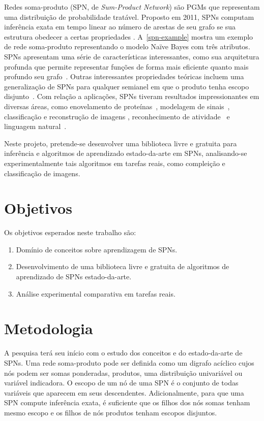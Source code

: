 \documentclass[12pt]{article}
\theoremstyle{plain}
\numberwithin{equation}{section}
\begin{document}
Redes soma-produto (SPN, de \textit{Sum-Product Network}) são PGMs que representam uma distribuição
de probabilidade tratável. Proposto em 2011, SPNs computam inferência exata em tempo linear ao
número de arestas de seu grafo se sua estrutura obedecer a certas propriedades
\cite{poon-domingos}. A~\autoref{spn-example} mostra um exemplo de rede soma-produto representando
o modelo Naïve Bayes com três atributos. SPNs apresentam uma série de características
interessantes, como sua arquitetura profunda que permite representar funções de forma mais
eficiente quanto mais profundo seu grafo~\cite{shallow-vs-deep}. Outras interessantes propriedades
teóricas incluem uma generalização de SPNs para qualquer semianel em que o produto tenha escopo
disjunto~\cite{sp-theorem}. Com relação a aplicações, SPNs tiveram resultados impressionantes em
diversas áreas, como enovelamento de proteínas~\cite{rec-dec-non-convex}, modelagem de
sinais~\cite{model-speech}, classificação e reconstrução de imagens
\cite{gens-domingos,poon-domingos,clustering}, reconhecimento de atividade~\cite{activity} e
linguagem natural~\cite{nat-lang}.

Neste projeto, pretende-se desenvolver uma biblioteca livre e gratuita para inferência e algoritmos
de aprendizado estado-da-arte em SPNs, analisando-se experimentalmente tais algoritmos em tarefas
reais, como compleição e classificação de imagens.

\section{Objetivos}

Os objetivos esperados neste trabalho são:

\begin{enumerate}
  \item Domínio de conceitos sobre aprendizagem de SPNs.
  \item Desenvolvimento de uma biblioteca livre e gratuita de algoritmos de aprendizado de SPNs
    estado-da-arte.
  \item Análise experimental comparativa em tarefas reais.
\end{enumerate}

\section{Metodologia}

A pesquisa terá seu início com o estudo dos conceitos e do estado-da-arte de SPNs. Uma rede
soma-produto pode ser definida como um digrafo acíclico cujos nós podem ser somas ponderadas,
produtos, uma distribuição univariável ou variável indicadora. O escopo de um nó de uma SPN é o
conjunto de todas variáveis que aparecem em seus descendentes. Adicionalmente, para que uma SPN
compute inferência exata, é suficiente que os filhos dos nós somas tenham mesmo escopo e os filhos
de nós produtos tenham escopos disjuntos.
\end{document}
